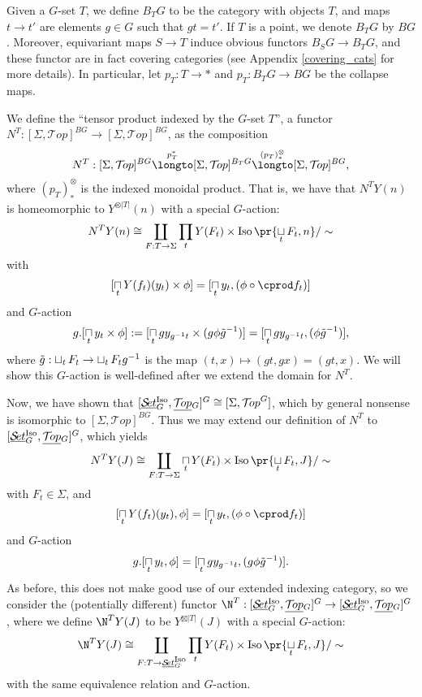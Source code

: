\documentclass{report}
\newcommand{\Top}{\text{$\mathcal{T}\!op$}}
\newcommand{\Set}{\text{$\mathcal{S}\!et$}}
\DeclareMathOperator{\Iso}{Iso}
\newcommand{\iso}[1]{\text{$\Iso\pr{#1}$}}
\newcommand{\TopG}{\text{\underline{$\Top$}$_G$}}
\newcommand{\SetG}{\text{\underline{$\Set$}$_G^{\mbox{\scriptsize Iso}}$}}
\renewcommand{\ST}{\text{$[\SetG,\TopG]^G$}}
\newcommand{\icap}{\operatornamewithlimits{\sqcap}}
\newcommand{\ico}{\operatornamewithlimits{\sqcup}}
\begin{document}
Given a $G$-set $T$, we define $B_TG$ to be the category with objects $T$, and maps $t\to t'$ are elements $g\in G$ such that $gt = t'$. If $T$ is a point, we denote $B_TG$ by $BG$. Moreover, equivariant maps $S\to T$ induce obvious functors $B_SG\to B_TG$, and these functor are in fact covering categories (see Appendix \ref{covering_cats} for more details). In particular, let $p_T: T\to *$ and $p_T: B_TG\to BG$ be the collapse maps.

We define the ``tensor product indexed by the $G$-set $T$'', a functor $N^T: [\Sigma,\Top]^{BG}\to[\Sigma,\Top]^{BG}$, as the composition
\[ N^T: [\Sigma,\Top]^{BG}\overset{p_T^*}{\longto} [\Sigma,\Top]^{B_TG} \overset{(p_T)_*^\otimes}{\longto}[\Sigma,\Top]^{BG},\]
where $(p_T)_*^\otimes$ is the indexed monoidal product. That is, we have that $N^TY(n)$ is homeomorphic to $Y^{\otimes|T|}(n)$ with a special $G$-action:
\[N^TY(n)\cong \coprod_{F:T\to\Sigma}\prod_tY(F_t)\times\iso{\ico_tF_t,n}/\sim\]
with 
\[[\icap_tY(f_t)(y_t)\times \phi]=[\icap_ty_t, (\phi\circ \cprod f_t)]\]
and $G$-action 
\[g.[\icap_ty_t\times\phi] := [\icap_tgy_{g^{-1}t}\times(g\phi\tilde g^{-1})] = [\icap_tgy_{g^{-1}t}, (\phi\tilde g^{-1})],\]
where $\tilde g: \ico_tF_t\to \ico_tF_tg^{-1}$ is the map $(t,x)\mapsto (gt,gx) = (gt,x)$. We will show this $G$-action is well-defined after we extend the domain for $N^T$. 

Now, we have shown that $\ST\cong[\Sigma,\Top^G]$, which by general nonsense is isomorphic to $[\Sigma,\Top]^{BG}$. Thus we may extend our definition of $N^T$ to $\ST$, which yields
\[N^TY(J)\cong \coprod_{F:T\to\Sigma}\icap_tY(F_t)\times\iso{\ico_tF_t,J}/\sim\]
with $F_t\in\Sigma$, and
\[[\icap_tY(f_t)(y_t),  \phi]=[\icap_ty_t, (\phi\circ \cprod f_t)]\]
and $G$-action 
\[g.[\icap_ty_t, \phi] = [\icap_tgy_{g^{-1}t}, (g\phi\tilde g^{-1})].\]
As before, this does not make good use of our extended indexing category, so we consider the (potentially different) functor $\N^T: \ST\to\ST$, where we define $\N^TY(J)$ to be $Y^{\boxtimes|T|}(J)$ with a special $G$-action:
\[\N^TY(J)\cong \coprod_{F:T\to \SetG}\prod_tY(F_t)\times\iso{\ico_tF_t,J}/\sim\]
with the same equivalence relation and $G$-action.
\end{document}
